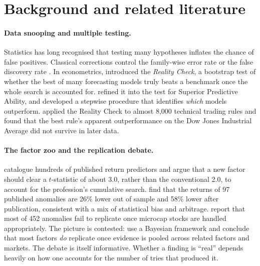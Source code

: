 \documentclass[11pt]{article}
\begin{document}
\section{Background and related literature}\label{sec:lit}

\paragraph{Data snooping and multiple testing.}
Statistics has long recognised that testing many hypotheses inflates the chance of false positives. Classical corrections control the family-wise error rate \citep{holm1979} or the false discovery rate \citep{benjamini1995}. In econometrics, \citet{white2000} introduced the \emph{Reality Check}, a bootstrap test of whether the best of many forecasting models truly beats a benchmark once the whole search is accounted for. \citet{hansen2005} refined it into the test for Superior Predictive Ability, and \citet{romano2005} developed a stepwise procedure that identifies \emph{which} models outperform. \citet{sullivan1999} applied the Reality Check to almost 8{,}000 technical trading rules and found that the best rule's apparent outperformance on the Dow Jones Industrial Average did not survive in later data.

\paragraph{The factor zoo and the replication debate.}
\citet{harvey2016} catalogue hundreds of published return predictors and argue that a new factor should clear a $t$-statistic of about 3.0, rather than the conventional 2.0, to account for the profession's cumulative search. \citet{mclean2016} find that the returns of 97 published anomalies are 26\% lower out of sample and 58\% lower after publication, consistent with a mix of statistical bias and arbitrage. \citet{hou2020} report that most of 452 anomalies fail to replicate once microcap stocks are handled appropriately. The picture is contested: \citet{jensen2023} use a Bayesian framework and conclude that most factors \emph{do} replicate once evidence is pooled across related factors and markets. The debate is itself informative. Whether a finding is ``real'' depends heavily on how one accounts for the number of tries that produced it.
\end{document}
